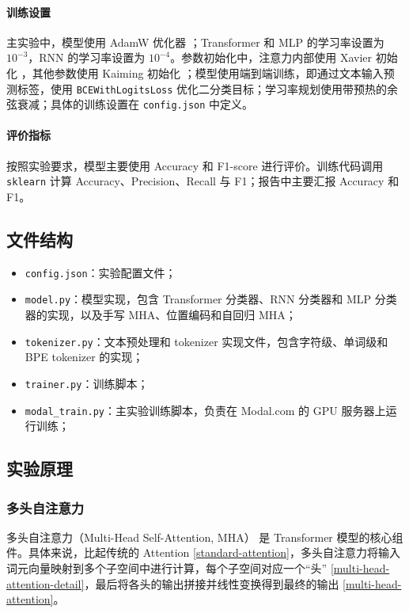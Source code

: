 \documentclass{ctexart}
\begin{document}
\paragraph{训练设置}
主实验中，模型使用 AdamW 优化器 \cite{loshchilov2017decoupled}；Transformer 和 MLP 的学习率设置为 $10^{-3}$，RNN 的学习率设置为 $10^{-4}$。参数初始化中，注意力内部使用 Xavier 初始化 \cite{glorot2010understanding}，其他参数使用 Kaiming 初始化 \cite{he2015delving}；模型使用端到端训练，即通过文本输入预测标签，使用 \verb|BCEWithLogitsLoss| 优化二分类目标；学习率规划使用带预热的余弦衰减；具体的训练设置在 \verb|config.json| 中定义。

\paragraph{评价指标}
按照实验要求，模型主要使用 Accuracy 和 F1-score 进行评价。训练代码调用 \verb|sklearn| 计算 Accuracy、Precision、Recall 与 F1；报告中主要汇报 Accuracy 和 F1。

\subsection{文件结构}

\begin{itemize}[noitemsep]
    \item \verb|config.json|：实验配置文件；
    \item \verb|model.py|：模型实现，包含 Transformer 分类器、RNN 分类器和 MLP 分类器的实现，以及手写 MHA、位置编码和自回归 MHA；
    \item \verb|tokenizer.py|：文本预处理和 tokenizer 实现文件，包含字符级、单词级和 BPE tokenizer 的实现；
    \item \verb|trainer.py|：训练脚本；
    \item \verb|modal_train.py|：主实验训练脚本，负责在 Modal.com 的 GPU 服务器上运行训练；
\end{itemize}

\subsection{实验原理}

\subsubsection{多头自注意力}

多头自注意力（Multi-Head Self-Attention, MHA）\cite{vaswani2017attention} 是 Transformer 模型的核心组件。具体来说，比起传统的 Attention \eqref{standard-attention}，多头自注意力将输入词元向量映射到多个子空间中进行计算，每个子空间对应一个“头” \eqref{multi-head-attention-detail}，最后将各头的输出拼接并线性变换得到最终的输出 \eqref{multi-head-attention}。
\end{document}
